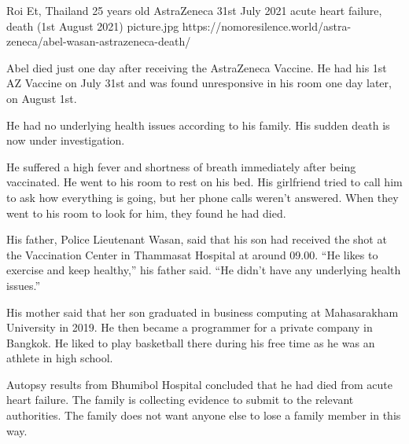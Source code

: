{Roi Et, Thailand}
{25 years old}
{AstraZeneca}
{31st July 2021}
{acute heart failure, death (1st August 2021)}
{picture.jpg}
{https://nomoresilence.world/astra-zeneca/abel-wasan-astrazeneca-death/}
{

Abel died just one day after receiving the AstraZeneca Vaccine. He had his 1st
AZ Vaccine on July 31st and was found unresponsive in his room one day later, on
August 1st.

He had no underlying health issues according to his family. His sudden death is
now under investigation.

He suffered a high fever and shortness of breath immediately after being
vaccinated. He went to his room to rest on his bed. His girlfriend tried to call
him to ask how everything is going, but her phone calls weren’t answered. When
they went to his room to look for him, they found he had died.

His father, Police Lieutenant Wasan, said that his son had received the shot at
the Vaccination Center in Thammasat Hospital at around 09.00. “He likes to
exercise and keep healthy,” his father said. “He didn’t have any underlying
health issues.”

His mother said that her son graduated in business computing at Mahasarakham
University in 2019. He then became a programmer for a private company in
Bangkok. He liked to play basketball there during his free time as he was an
athlete in high school.

Autopsy results from Bhumibol Hospital concluded that he had died from acute
heart failure. The family is collecting evidence to submit to the relevant
authorities. The family does not want anyone else to lose a family member in
this way.

}
